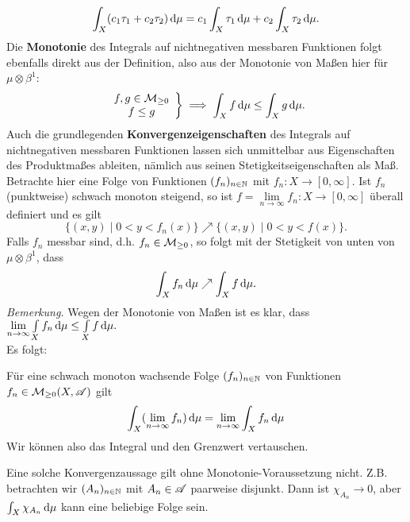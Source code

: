 \begin{equation*}
\begin{split}
\int_X (c_1\tau_1+c_2\tau_2)\D \mu = c_1 \int_X \tau_1 \D \mu +c_2 \int_X \tau_2 \D \mu.
\end{split}
\end{equation*}
Die \textbf{Monotonie} des Integrals auf nichtnegativen messbaren Funktionen folgt ebenfalls direkt aus der Definition, also aus der Monotonie von Maßen hier für $\mu\otimes \beta^1$:
\begin{equation}\label{monotonie-nichtneg}
{\begin{rcases}
\begin{array}{c}
f,g \in \MM_{\geq 0}\\
f\leq g\end{array}
\end{rcases} \implies
\int_X f \D \mu \leq \int_X g \D \mu.}
\end{equation}
Auch die grundlegenden \textbf{Konvergenzeigenschaften} des Integrals auf nichtnegativen messbaren Funktionen lassen sich unmittelbar aus Eigenschaften des Produktmaßes ableiten, nämlich aus seinen Stetigkeitseigenschaften als Maß. \\
Betrachte hier eine Folge von Funktionen $(f_n)_{n \in \N}$ mit $f_n:X \longrightarrow [0,\infty]$. Ist $f_n$ (punktweise) schwach monoton steigend, so ist $f=\lim\limits_{n\to\infty} f_n :X \longrightarrow [0,\infty]$ überall definiert und es gilt
$$
\{(x,y) \mid 0<y<f_n(x)\} \nearrow \{(x,y) \mid 0<y<f(x)\}.
$$
Falls $f_n$ messbar sind, d.h. $f_n \in \MM_{\geq 0}$, so folgt mit der Stetigkeit von unten von $\mu \otimes \beta^1$, dass 
$$ \int_X f_n \D \mu \nearrow \int_X f \D \mu.$$
\textit{Bemerkung.} Wegen der Monotonie von Maßen ist es klar, dass $\lim\limits_{n\to\infty} \int\limits_X f_n \D \mu \leq \int\limits_X f \D \mu.$\\ Es folgt:

\begin{satz}
\begin{mdframed}
Für eine schwach \newline monoton wachsende Folge $(f_n)_{n \in \N}$ von Funktionen $f_n \in \MM_{\geq 0}(X,\AA)$ gilt
$$
\int_X (\lim_{n \to \infty} f_n) \D \mu =\lim_{n \to \infty} \int_X f_n \D \mu
$$
Wir können also das Integral und den Grenzwert vertauschen.
\end{mdframed}
\end{satz}

\begin{remark}
Eine solche Konvergenzaussage gilt ohne Monotonie-Voraussetzung nicht. Z.B. betrachten wir $(A_n)_{n \in \N}$ mit $A_n \in \AA$ paarweise disjunkt. Dann ist $\chi_{A_n}\longrightarrow 0$, aber $\int_X \chi_{A_n}\D\mu$ kann eine beliebige Folge sein.
\end{remark}

